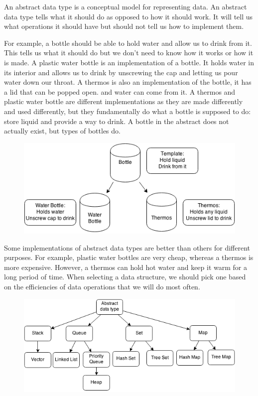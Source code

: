 \documentclass[11pt,oneside]{book}
\makeatletter
\def\maxwidth#1{\ifdim\Gin@nat@width>#1 #1\else\Gin@nat@width\fi}
\makeatother
\begin{document}
An abstract data type is a conceptual model for representing data. An abstract data type tells what it should do as opposed to how it should work. It will tell us what operations it should have but should not tell us how to implement them.

For example, a bottle should be able to hold water and allow us to drink from it. This tells us what it should do but we don't need to know how it works or how it is made. A plastic water bottle is an implementation of a bottle. It holds water in its interior and allows us to drink by unscrewing the cap and letting us pour water down our throat. A thermos is also an implementation of the bottle, it has a lid that can be popped open. and water can come from it. A thermos and plastic water bottle are different implementations as they are made differently and used differently, but they fundamentally do what a bottle is supposed to do: store liquid and provide a way to drink. A bottle in the abstract does not actually exist, but types of bottles do.

\vspace{5px}\begin{figure}[H]\centering
        \includegraphics[width=0.66\maxwidth{\textwidth}]{bottle.png}
        \end{figure}

Some implementations of abstract data types are better than others for different purposes. For example, plastic water bottles are very cheap, whereas a thermos is more expensive. However, a thermos can hold hot water and keep it warm for a long period of time. When selecting a data structure, we should pick one based on the efficiencies of data operations that we will do most often.

\vspace{5px}\begin{figure}[H]\centering
        \includegraphics[width=0.66\maxwidth{\textwidth}]{adt.png}
        \end{figure}
\end{document}
